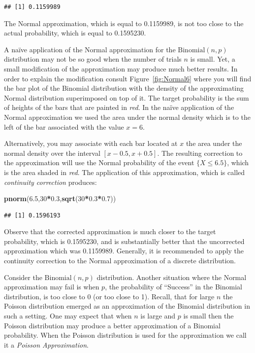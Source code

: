 \documentclass[
]{krantz}
\makeatletter
\newenvironment{Shaded}{\begin{snugshade}}{\end{snugshade}}
\newcommand{\DecValTok}[1]{\textcolor[rgb]{0.00,0.00,0.81}{#1}}
\newcommand{\FloatTok}[1]{\textcolor[rgb]{0.00,0.00,0.81}{#1}}
\newcommand{\KeywordTok}[1]{\textcolor[rgb]{0.13,0.29,0.53}{\textbf{#1}}}
\newcommand{\NormalTok}[1]{#1}
\newcommand{\OperatorTok}[1]{\textcolor[rgb]{0.81,0.36,0.00}{\textbf{#1}}}
\newenvironment{kframe}{%
\medskip{}
\setlength{\fboxsep}{.8em}
 \def\at@end@of@kframe{}%
 \ifinner\ifhmode%
  \def\at@end@of@kframe{\end{minipage}}%
  \begin{minipage}{\columnwidth}%
 \fi\fi%
 \def\FrameCommand##1{\hskip\@totalleftmargin \hskip-\fboxsep
 \colorbox{shadecolor}{##1}\hskip-\fboxsep
     \hskip-\linewidth \hskip-\@totalleftmargin \hskip\columnwidth}%
 \MakeFramed {\advance\hsize-\width
   \@totalleftmargin\z@ \linewidth\hsize
   \@setminipage}}%
 {\par\unskip\endMakeFramed%
 \at@end@of@kframe}
\renewenvironment{Shaded}{\begin{kframe}}{\end{kframe}}
\theoremstyle{definition}
\theoremstyle{definition}
\theoremstyle{definition}
\theoremstyle{remark}
\makeatother
\begin{document}
\begin{verbatim}
## [1] 0.1159989
\end{verbatim}

The Normal approximation, which is equal to 0.1159989, is not too close
to the actual probability, which is equal to 0.1595230.

A naïve application of the Normal approximation for the
\(\mathrm{Binomial}(n,p)\) distribution may not be so good when the number
of trials \(n\) is small. Yet, a small modification of the approximation
may produce much better results. In order to explain the modification
consult Figure~\ref{fig:Normal6} where you will find the bar plot of the
Binomial distribution with the density of the approximating Normal
distribution superimposed on top of it. The target probability is the
sum of heights of the bars that are painted in \emph{red}. In the naïve
application of the Normal approximation we used the area under the
normal density which is to the left of the bar associated with the value
\(x=6\).

Alternatively, you may associate with each bar located at \(x\) the area
under the normal density over the interval \([x-0.5, x+0.5]\). The
resulting correction to the approximation will use the Normal
probability of the event \(\{X \leq 6.5\}\), which is the area shaded in
\emph{red}. The application of this approximation, which is called
\emph{continuity correction} produces:

\begin{Shaded}
\begin{Highlighting}[]
\KeywordTok{pnorm}\NormalTok{(}\FloatTok{6.5}\NormalTok{,}\DecValTok{30}\OperatorTok{*}\FloatTok{0.3}\NormalTok{,}\KeywordTok{sqrt}\NormalTok{(}\DecValTok{30}\OperatorTok{*}\FloatTok{0.3}\OperatorTok{*}\FloatTok{0.7}\NormalTok{))}
\end{Highlighting}
\end{Shaded}

\begin{verbatim}
## [1] 0.1596193
\end{verbatim}

Observe that the corrected approximation is much closer to the target
probability, which is 0.1595230, and is substantially better that the
uncorrected approximation which was 0.1159989. Generally, it is
recommended to apply the continuity correction to the Normal
approximation of a discrete distribution.

Consider the \(\mathrm{Binomial}(n,p)\) distribution. Another situation
where the Normal approximation may fail is when \(p\), the probability of
``Success'' in the Binomial distribution, is too close to 0 (or too close
to 1). Recall, that for large \(n\) the Poisson distribution emerged as an
approximation of the Binomial distribution in such a setting. One may
expect that when \(n\) is large and \(p\) is small then the Poisson
distribution may produce a better approximation of a Binomial
probability. When the Poisson distribution is used for the approximation
we call it a \emph{Poisson Approximation}.
\end{document}
